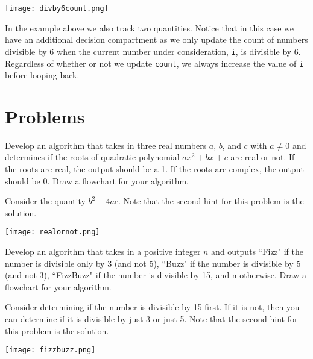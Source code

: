 \documentclass{ximera}
\begin{document}
\begin{center}
	\texttt{[image: divby6count.png]}
\end{center}

In the example above we also track two quantities. Notice that in this case we have an additional decision compartment as we only update the count of numbers divisible by 6 when the current number under consideration, \verb|i|, is divisible by 6. Regardless of whether or not we update \verb|count|, we always increase the value of \verb|i| before looping back.

\section{Problems}

\begin{question}
	Develop an algorithm that takes in three real numbers $a$, $b$, and $c$ with $a\neq 0$ and determines if the roots of quadratic polynomial $ax^2+bx+c$ are real or not. If the roots are real, the output should be a 1. If the roots are complex, the output should be 0. Draw a flowchart for your algorithm.
	\begin{hint}
		Consider the quantity $b^2-4ac$. Note that the second hint for this problem is the solution.
	\end{hint}
	
	\begin{hint}
		\begin{center}
			\texttt{[image: realornot.png]}
		\end{center}
	\end{hint}
\end{question}

\begin{question}
	Develop an algorithm that takes in a positive integer $n$ and outputs ``Fizz" if the number is divisible only by 3 (and not 5), ``Buzz" if the number is divisible by 5 (and not 3), ``FizzBuzz" if the number is divisible by 15, and n otherwise. Draw a flowchart for your algorithm.
	\begin{hint}
		Consider determining if the number is divisible by 15 first. If it is not, then you can determine if it is divisible by just 3 or just 5. Note that the second hint for this problem is the solution.
	\end{hint}
	\begin{hint}
		\begin{center}
			\texttt{[image: fizzbuzz.png]}
		\end{center}
	\end{hint}
\end{question}
\end{document}
